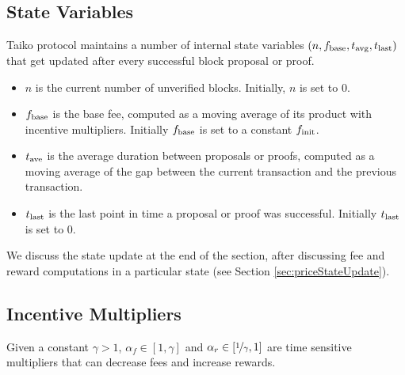 \documentclass[9pt,oneside]{amsart}
\begin{document}
\begin{multicols}{2}
\subsection{State Variables}
Taiko protocol maintains a number of internal state variables $(n, f_\textnormal{base}, t_\textnormal{avg}, t_\textnormal{last})$ that get updated after every successful block proposal or proof.
\begin{itemize}
    \item $n$ is the current number of unverified blocks. Initially, $n$ is set to $0$.
    \item $f_\textnormal{base}$ is the base fee, computed as a moving average of its product with incentive multipliers. Initially $f_\textnormal{base}$ is set to a constant $f_\textnormal{init}$.
    \item $t_\textnormal{ave}$ is the average duration between proposals or proofs, computed as a moving average of the gap between the current transaction and the previous transaction.
    \item $t_\textnormal{last}$ is the last point in time a proposal or proof was successful. Initially $t_\textnormal{last}$ is set to $0$. 
\end{itemize}
We discuss the state update at the end of the section, after discussing fee and reward computations in a particular state (see Section \ref{sec:priceStateUpdate}). 




    


\subsection{Incentive Multipliers} Given a constant $\gamma > 1$, 
$\alpha_f \in [1, \gamma]$ and $\alpha_r \in [ \nicefrac{1}{\gamma},1]$ are time sensitive multipliers that can decrease fees and increase rewards. 


\end{multicols}
\end{document}
